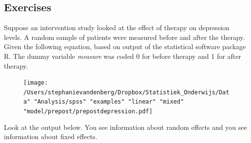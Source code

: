 \documentclass[]{report}\usepackage[]{graphicx}\usepackage[]{color}
\begin{document}
\subsection{Exercises}

Suppose an intervention study looked at the effect of therapy on depression levels. A random sample of patients were measured before and after the therapy. Given the following equation, based on output of the statistical software package R. The dummy variable \textit{measure} was coded 0 for before therapy and 1 for after therapy.




\begin{figure}[h]
    \begin{center}
       \texttt{[image: /Users/stephanievandenberg/Dropbox/Statistiek\_Onderwijs/Data" "Analysis/spss" "examples" "linear" "mixed" "model/prepost/prepostdepression.pdf]}
    \end{center}
\end{figure}


Look at the output below. You see information about random effects and you see information about fixed effects. 
\end{document}
